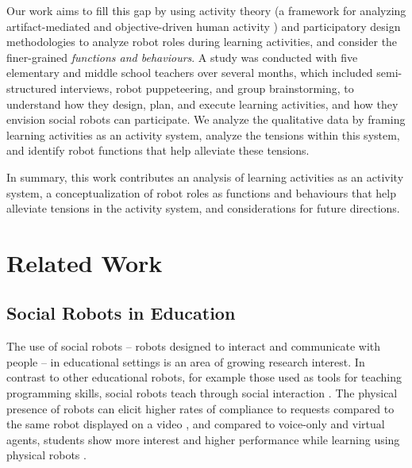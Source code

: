 Our work aims to fill this gap by using activity theory (a framework for analyzing artifact-mediated and objective-driven human activity \cite{Engestrom2010,nardi09,Kaptelinin2012}) and participatory design methodologies to analyze robot roles during learning activities, and consider the finer-grained {\it functions and behaviours}. A study was conducted with five elementary and middle school teachers over several months, which included semi-structured interviews, robot puppeteering, and group brainstorming, to understand how they design, plan, and execute learning activities, and how they envision social robots can participate.  We analyze the qualitative data by framing learning activities as an activity system, analyze the tensions within this system, and identify robot functions that help alleviate these tensions.  

In summary, this work contributes an analysis of learning activities as an activity system, a conceptualization of robot roles as functions and behaviours that help alleviate tensions in the activity system, and considerations for future directions.


\section{Related Work}
\label{sec:1}
\subsection{Social Robots in Education}
\label{sec:2}
The use of social robots -- robots designed to interact and communicate with people -- in educational settings is an area of growing research interest. In contrast to other educational robots, for example those used as tools for teaching programming skills, social robots teach through social interaction \cite{belpaeme2018social}. The physical presence of robots can elicit higher rates of compliance to requests compared to the same robot displayed on a video \cite{bainbridge2011}, and compared to voice-only and virtual agents, students show more interest and higher performance while learning using physical robots \cite{Leyzberg2012}. 



